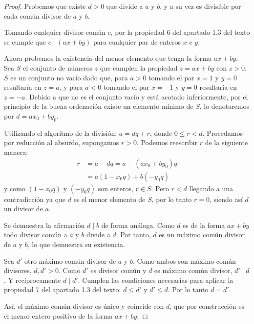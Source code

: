 \begin{proof}
    Probemos que existe $d > 0$ que divide a $a$ y $b$, y
    a su vez es divisible por cada común divisor de $a$ y $b$.

    Tomando cualquier divisor común $c$,
    por la propiedad 6 del apartado 1.3 del texto se cumple que $c \mid (ax + by)$
    para cualquier par de enteros $x$ e $y$.

    Ahora probemos la existencia del menor elemento que tenga la forma $ax + by$.
    Sea $S$ el conjunto de números $z$ que cumplen la propiedad $z = ax + by$ con $z > 0$.
    $S$ es un conjunto no vacío dado que, para $a > 0$ tomando el par $x = 1$ y $y = 0$
    resultaría en $z = a$, y para $a < 0$ tomando el par $x = -1$ y $y = 0$ resultaría en $z = -a$.
    Debido a que no es el conjunto vacío y está acotado inferiormente, por el principio
    de la buena ordenación existe un elemento mínimo de $S$, lo denotaremos por $d = ax_0 + by_0$.

    Utilizando el algoritmo de la división: $a = dq + r$, donde $0 \le r < d$.
    Procedamos por reducción al absurdo, supongamos $r > 0$.
    Podemos reescribir $r$ de la siguiente manera:
    \begin{align*}
        r &= a - dq = a - (ax_0 + by_0)q \\
          &= a(1 - x_0q) + b(-y_0q)
    \end{align*}
    y como $(1 - x_0q)$ y $(-y_0q)$ son enteros, $r \in S$. Pero $r < d$ llegando a una contradicción
    ya que $d$ es el menor elemento de $S$, por lo tanto $r = 0$, siendo así $d$ un divisor de $a$.

    Se demuestra la afirmación $d \mid b$ de forma análoga.
    Como $d$ es de la forma $ax + by$ todo divisor común a $a$ y $b$ divide a $d$.
    Por tanto, $d$ es un máximo común divisor de $a$ y $b$, lo que demuestra su existencia.

    Sea $d'$ otro máximo común divisor de $a$ y $b$.
    Como ambos son máximo común divisores, $d, d' > 0$.
    Como $d'$ es divisor común y $d$ es máximo común divisor, $d' \mid d$.
    Y recíprocamente $d \mid d'$.
    Cumplen las condiciones necesarias para aplicar la propiedad 7
    del apartado 1.3 del texto: $d \le d'$ y $d' \le d$.
    Por lo tanto $d = d'$.

    Así, el máximo común divisor es único y coincide con $d$,
    que por construcción es el menor entero positivo de la forma $ax + by$.
\end{proof}


